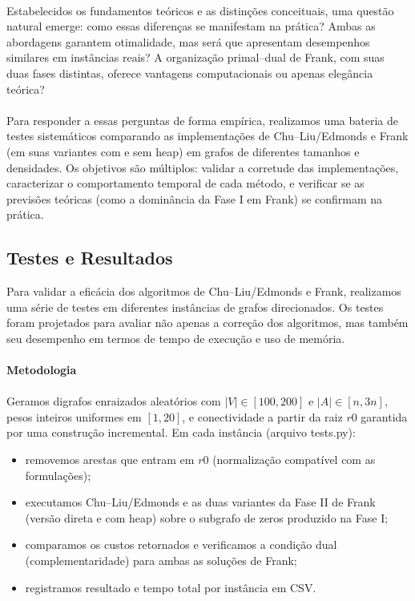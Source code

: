 \documentclass[12pt,a4paper]{article}
\def\texttt#1{#1}%
\def\emph#1{#1}%
\begin{document}
\paragraph{}
Estabelecidos os fundamentos teóricos e as distinções conceituais, uma questão natural emerge: \emph{como essas diferenças se manifestam na prática?} Ambas as abordagens garantem otimalidade, mas será que apresentam desempenhos similares em instâncias reais? A organização primal–dual de Frank, com suas duas fases distintas, oferece vantagens computacionais ou apenas elegância teórica?

\paragraph{}
Para responder a essas perguntas de forma empírica, realizamos uma bateria de testes sistemáticos comparando as implementações de Chu–Liu/Edmonds e Frank (em suas variantes com e sem heap) em grafos de diferentes tamanhos e densidades. Os objetivos são múltiplos: validar a corretude das implementações, caracterizar o comportamento temporal de cada método, e verificar se as previsões teóricas (como a dominância da Fase I em Frank) se confirmam na prática.

\subsection{Testes e Resultados}

Para validar a eficácia dos algoritmos de \emph{Chu–Liu/Edmonds} e \emph{Frank}, realizamos uma série de testes em diferentes instâncias de grafos direcionados. Os testes foram projetados para avaliar não apenas a correção dos algoritmos, mas também seu desempenho em termos de tempo de execução e uso de memória.

\paragraph{Metodologia}
\paragraph{}
Geramos digrafos enraizados aleatórios com \(|V|\in[100,200]\) e \(|A|\in[n,3n]\), pesos inteiros uniformes em \([1,20]\), e conectividade a partir da raiz \(r0\) garantida por uma construção incremental. Em cada instância (arquivo \texttt{tests.py}):
\begin{itemize}\setlength{\itemsep}{1pt}
    \item removemos arestas que entram em \(r0\) (normalização compatível com as formulações);
    \item executamos \emph{Chu–Liu/Edmonds} e as duas variantes da Fase II de \emph{Frank} (versão direta e com heap) sobre o subgrafo de zeros produzido na Fase I;
    \item comparamos os custos retornados e verificamos a \emph{condição dual} (complementaridade) para ambas as soluções de Frank;
    \item registramos resultado e tempo total por instância em CSV.
\end{itemize}
\end{document}
